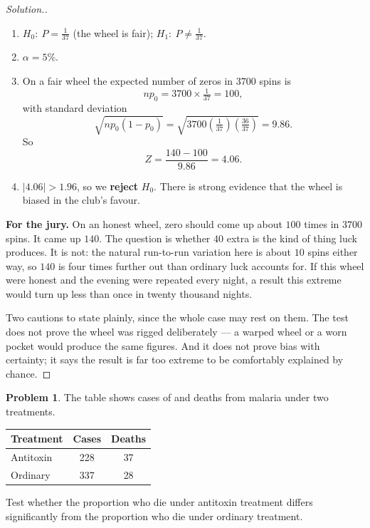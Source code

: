 \documentclass[11pt,a4paper]{article}
\theoremstyle{definition}
\newtheorem{problemx}{Problem}[section]
\newenvironment{problem}{\begin{problemx}}{\end{problemx}}
\newenvironment{solution}
  {\renewcommand{\qedsymbol}{}\begin{proof}[\textit{Solution}.]}
  {\end{proof}}
\begin{document}
\begin{solution}
\begin{enumerate}
\item $H_0:\ P=\tfrac{1}{37}$ (the wheel is fair); $H_1:\ P\neq\tfrac{1}{37}$.
\item $\alpha=5\%$.
\item On a fair wheel the expected number of zeros in $3700$ spins is
\[np_0=3700\times\tfrac{1}{37}=100,\]
with standard deviation
\[\sqrt{np_0(1-p_0)}=\sqrt{3700\left(\tfrac{1}{37}\right)\left(\tfrac{36}{37}\right)}=9.86.\]
So
\[Z=\frac{140-100}{9.86}=4.06.\]
\item $|4.06|>1.96$, so we \textbf{reject} $H_0$. There is strong evidence that the wheel is
biased in the club's favour.
\end{enumerate}

\textbf{For the jury.} On an honest wheel, zero should come up about $100$ times in $3700$
spins. It came up $140$. The question is whether $40$ extra is the kind of thing luck
produces. It is not: the natural run-to-run variation here is about $10$ spins either way, so
$140$ is four times further out than ordinary luck accounts for. If this wheel were honest
and the evening were repeated every night, a result this extreme would turn up less than once
in twenty thousand nights.

Two cautions to state plainly, since the whole case may rest on them. The test does not prove
the wheel was rigged deliberately --- a warped wheel or a worn pocket would produce the same
figures. And it does not prove bias with certainty; it says the result is far too extreme to
be comfortably explained by chance.
\end{solution}

\begin{problem}
The table shows cases of and deaths from malaria under two treatments.
\begin{table}[H]
\centering
\begin{tabular}{|l|c|c|}
\hline
Treatment & Cases & Deaths\\
\hline
Antitoxin & 228 & 37\\
Ordinary & 337 & 28\\
\hline
\end{tabular}
\end{table}
Test whether the proportion who die under antitoxin treatment differs significantly from the
proportion who die under ordinary treatment.
\end{problem}
\end{document}
